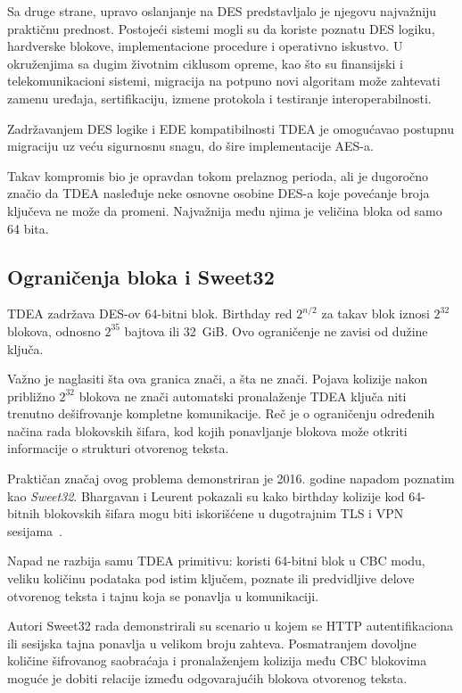 Sa druge strane, upravo oslanjanje na DES predstavljalo je njegovu
najvažniju praktičnu prednost. Postojeći sistemi mogli su da koriste
poznatu DES logiku, hardverske blokove, implementacione procedure i
operativno iskustvo. U okruženjima sa dugim životnim ciklusom opreme,
kao što su finansijski i telekomunikacioni sistemi, migracija na
potpuno novi algoritam može zahtevati zamenu uređaja, sertifikaciju,
izmene protokola i testiranje interoperabilnosti.

Zadržavanjem DES logike i EDE kompatibilnosti TDEA je omogućavao
postupnu migraciju uz veću sigurnosnu snagu, do šire implementacije AES-a.

Takav kompromis bio je opravdan tokom prelaznog perioda, ali je
dugoročno značio da TDEA nasleđuje neke osnovne osobine DES-a koje
povećanje broja ključeva ne može da promeni. Najvažnija među njima je
veličina bloka od samo 64 bita.


\subsection{Ograničenja bloka i Sweet32}
\label{subsec:tdea_sweet32}

TDEA zadržava DES-ov 64-bitni blok. Birthday red $2^{n/2}$ za takav
blok iznosi $2^{32}$ blokova, odnosno $2^{35}$ bajtova ili 32~GiB.
Ovo ograničenje ne zavisi od dužine ključa.

Važno je naglasiti šta ova granica znači, a šta ne znači.
Pojava kolizije nakon približno $2^{32}$ blokova ne znači automatski
pronalaženje TDEA ključa niti trenutno dešifrovanje kompletne
komunikacije. Reč je o ograničenju određenih načina rada blokovskih
šifara, kod kojih ponavljanje blokova može otkriti informacije o
strukturi otvorenog teksta.

Praktičan značaj ovog problema demonstriran je 2016. godine napadom
poznatim kao \emph{Sweet32}. Bhargavan i Leurent pokazali su kako
birthday kolizije kod 64-bitnih blokovskih šifara mogu biti iskorišćene
u dugotrajnim TLS i VPN sesijama~\cite{sweet32-2016}.

Napad ne razbija samu TDEA primitivu: koristi 64-bitni blok u CBC modu,
veliku količinu podataka pod istim ključem, poznate ili predvidljive
delove otvorenog teksta i tajnu koja se ponavlja u komunikaciji.

Autori Sweet32 rada demonstrirali su scenario u kojem se HTTP
autentifikaciona ili sesijska tajna ponavlja u velikom broju zahteva.
Posmatranjem dovoljne količine šifrovanog saobraćaja i pronalaženjem
kolizija među CBC blokovima moguće je dobiti relacije između odgovarajućih
blokova otvorenog teksta.

